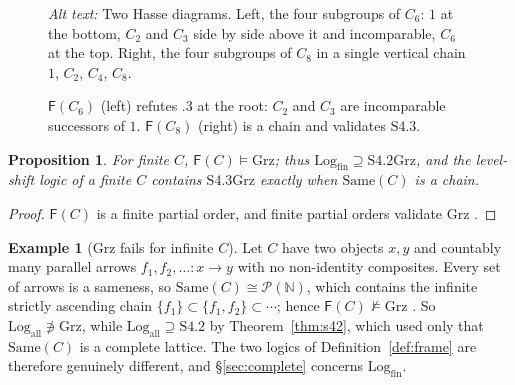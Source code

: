 \documentclass[11pt]{amsart}
\newtheorem{prop}[thm]{Proposition}
\theoremstyle{definition}
\newtheorem{ex}[thm]{Example}
\newcommand{\Same}{\mathrm{Same}}
\newcommand{\Log}{\mathrm{Log}}
\newcommand{\Fr}{\mathsf{F}}
\newcommand{\Grz}{\mathrm{Grz}}
\begin{document}
\begin{figure}[ht]
\centering
{}
\qquad\qquad
{}
\caption{$\Fr(C_6)$ (left) refutes $.3$ at the root: $C_2$ and $C_3$ are
incomparable successors of $1$. $\Fr(C_8)$ (right) is a chain and validates
$\mathrm{S4.3}$.}
\label{fig:c6}
\par\smallskip\noindent\textit{Alt text:} Two Hasse diagrams. Left, the four subgroups of $C_6$: $1$ at the bottom,
$C_2$ and $C_3$ side by side above it and incomparable, $C_6$ at the top.
Right, the four subgroups of $C_8$ in a single vertical chain $1$, $C_2$,
$C_4$, $C_8$.
\end{figure}

\begin{prop}\label{prop:grz}
For finite $C$, $\Fr(C)\models\Grz$; thus $\Log_{\mathrm{fin}}\supseteq
\mathrm{S4.2Grz}$, and the level-shift logic of a finite $C$ contains
$\mathrm{S4.3Grz}$ exactly when $\Same(C)$ is a chain.
\end{prop}
\begin{proof}
$\Fr(C)$ is a finite partial order, and finite partial orders validate $\Grz$
\cite{CZ97}.
\end{proof}

\begin{ex}[$\Grz$ fails for infinite $C$]\label{ex:infinite}
Let $C$ have two objects $x,y$ and countably many parallel arrows
$f_1,f_2,\dots\colon x\to y$ with no non-identity composites. Every set of
arrows is a sameness, so $\Same(C)\cong\mathcal P(\mathbb N)$, which contains
the infinite strictly ascending chain $\{f_1\}\subset\{f_1,f_2\}\subset\cdots$;
hence $\Fr(C)\not\models\Grz$ \cite{CZ97}. So $\Log_{\mathrm{all}}\not\ni\Grz$,
while $\Log_{\mathrm{all}}\supseteq\mathrm{S4.2}$ by Theorem~\ref{thm:s42},
which used only that $\Same(C)$ is a complete lattice. The two logics of
Definition~\ref{def:frame} are therefore genuinely different, and
\S\ref{sec:complete} concerns $\Log_{\mathrm{fin}}$.
\end{ex}
\end{document}
